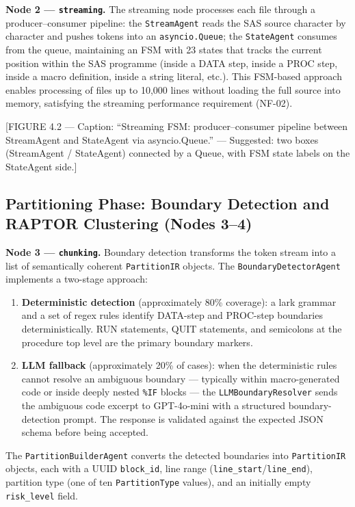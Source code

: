 \textbf{Node 2 --- \texttt{streaming}.} The streaming node processes each file
through a producer--consumer pipeline: the \texttt{StreamAgent} reads the SAS
source character by character and pushes tokens into an \texttt{asyncio.Queue};
the \texttt{StateAgent} consumes from the queue, maintaining an FSM with 23
states that tracks the current position within the SAS programme (inside a DATA
step, inside a PROC step, inside a macro definition, inside a string literal,
etc.). This FSM-based approach enables processing of files up to 10,000 lines
without loading the full source into memory, satisfying the streaming performance
requirement (NF-02).

[FIGURE 4.2 --- Caption: ``Streaming FSM: producer--consumer pipeline between
StreamAgent and StateAgent via asyncio.Queue.'' --- Suggested: two boxes
(StreamAgent / StateAgent) connected by a Queue, with FSM state labels on the
StateAgent side.]

\subsection{Partitioning Phase: Boundary Detection and RAPTOR Clustering (Nodes 3--4)}
\label{subsec:nodes-partition}

\textbf{Node 3 --- \texttt{chunking}.} Boundary detection transforms the
token stream into a list of semantically coherent \texttt{PartitionIR} objects.
The \texttt{BoundaryDetectorAgent} implements a two-stage approach:

\begin{enumerate}
  \item \textbf{Deterministic detection} (approximately 80\% coverage): a lark
    grammar and a set of regex rules identify DATA-step and PROC-step
    boundaries deterministically. RUN statements, QUIT statements, and
    semicolons at the procedure top level are the primary boundary markers.
  \item \textbf{LLM fallback} (approximately 20\% of cases): when the
    deterministic rules cannot resolve an ambiguous boundary --- typically
    within macro-generated code or inside deeply nested \texttt{\%IF} blocks
    --- the \texttt{LLMBoundaryResolver} sends the ambiguous code excerpt to
    GPT-4o-mini with a structured boundary-detection prompt. The response is
    validated against the expected JSON schema before being accepted.
\end{enumerate}

The \texttt{PartitionBuilderAgent} converts the detected boundaries into
\texttt{PartitionIR} objects, each with a UUID \texttt{block\_id}, line range
(\texttt{line\_start}/\texttt{line\_end}), partition type
(one of ten \texttt{PartitionType} values), and an initially empty
\texttt{risk\_level} field.

